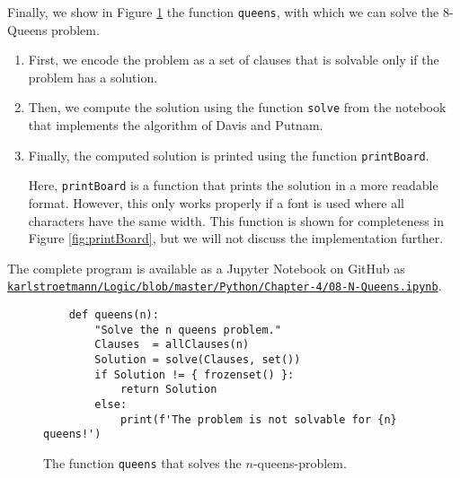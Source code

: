 Finally, we show in Figure \ref{fig:solve:queens} the function
\texttt{queens}, with which we can solve the 8-Queens problem.
\begin{enumerate}
\item First, we encode the problem as a set of clauses that is solvable
      only if the problem has a solution.
\item Then, we compute the solution using the function \texttt{solve} from the notebook
      that implements the algorithm of Davis and Putnam.
\item Finally, the computed solution is printed using the function \texttt{printBoard}.

      Here, \texttt{printBoard} is a function that prints the solution in a more readable format.
      However, this only works properly if a font is used where all characters have the same width.
      This function is shown for completeness in Figure \ref{fig:printBoard}, but we will not discuss the implementation further.
\end{enumerate}
The complete program is available as a Jupyter Notebook on GitHub as
\\[0.2cm]
\hspace*{0.0cm}
\href{https://github.com/karlstroetmann/Logic/blob/master/Python/Chapter-4/08-N-Queens.ipynb}{\texttt{karlstroetmann/Logic/blob/master/Python/Chapter-4/08-N-Queens.ipynb}}.




\begin{figure}[!ht]
\centering
\begin{verbatim}
    def queens(n):
        "Solve the n queens problem."
        Clauses  = allClauses(n)
        Solution = solve(Clauses, set())
        if Solution != { frozenset() }:
            return Solution
        else:
            print(f'The problem is not solvable for {n} queens!')
\end{verbatim}
\vspace*{-0.3cm}
\caption{The function \texttt{queens} that solves the $n$-queens-problem.}
\label{fig:solve:queens}
\end{figure}


